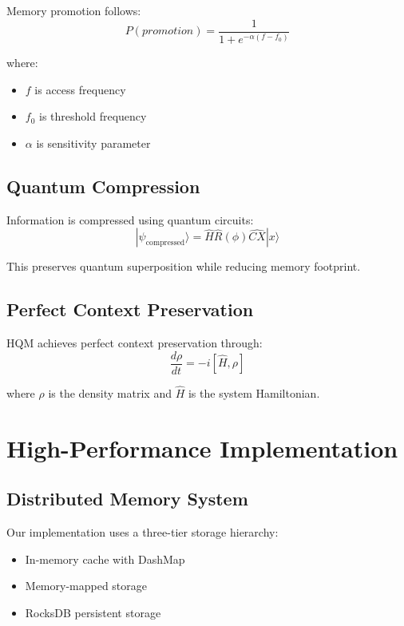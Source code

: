 \documentclass[10pt,twocolumn]{article}
\begin{document}
Memory promotion follows:
\begin{equation}
    P(promotion) = \frac{1}{1 + e^{-\alpha(f - f_0)}}
\end{equation}

where:
\begin{itemize}
    \item $f$ is access frequency
    \item $f_0$ is threshold frequency
    \item $\alpha$ is sensitivity parameter
\end{itemize}

\subsection{Quantum Compression}
Information is compressed using quantum circuits:
\begin{equation}
    |\psi_{\text{compressed}}\rangle = \hat{H}\hat{R}(\phi)\hat{CX}|x\rangle
\end{equation}

This preserves quantum superposition while reducing memory footprint.

\subsection{Perfect Context Preservation}
HQM achieves perfect context preservation through:
\begin{equation}
    \frac{d\rho}{dt} = -i[\hat{H}, \rho]
\end{equation}

where $\rho$ is the density matrix and $\hat{H}$ is the system Hamiltonian.

\section{High-Performance Implementation}
\subsection{Distributed Memory System}
Our implementation uses a three-tier storage hierarchy:
\begin{itemize}
    \item In-memory cache with DashMap
    \item Memory-mapped storage
    \item RocksDB persistent storage
\end{itemize}
\end{document}
